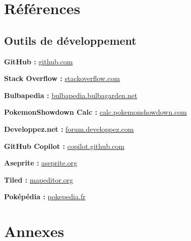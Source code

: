 \documentclass[12pt,a4paper, twoside]{article}
\begin{document}
\section{Références}
\subsection{Outils de développement}
\label{annexe:github}
\textbf{GitHub :} \href{https://github.com/Lounol72/ICPocket}{github.com}

\label{annexe:stackoverflow}
\textbf{Stack Overflow :} \href{https://stackoverflow.com/questions/tagged/sdl}{stackoverflow.com}

\label{annexe:bulbapedia}
\textbf{Bulbapedia :} \href{https://bulbapedia.bulbagarden.net/wiki}{bulbapedia.bulbagarden.net}

\label{annexe:showdown}
\textbf{PokemonShowdown Calc :} \href{https://calc.pokemonshowdown.com}{calc.pokemonshowdown.com}

\label{annexe:developpez}
\textbf{Developpez.net :} \href{https://forum.developpez.com}{forum.developpez.com}

\label{annexe:copilot}
\textbf{GitHub Copilot :} \href{https://copilot.github.com/}{copilot.github.com}

\label{annexe:aseprite}
\textbf{Aseprite :} \href{https://www.aseprite.org/}{aseprite.org}

\label{annexe:tiled}
\textbf{Tiled :} \href{https://www.mapeditor.org/}{mapeditor.org}

\label{annexe:pokepedia}
\textbf{Poképédia :} \href{https://www.pokepedia.fr/}{pokepedia.fr}

\section{Annexes}
\end{document}
